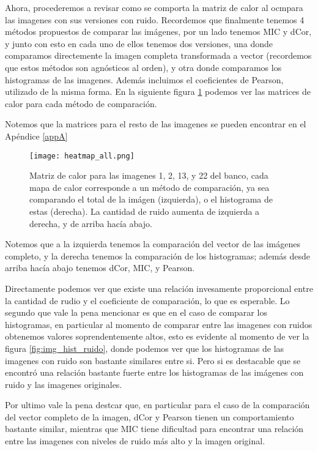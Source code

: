Ahora, procederemos a revisar como se comporta la matriz de calor al ocmpara las imagenes con sus versiones con ruido. Recordemos que finalmente tenemos 4 m\'etodos propuestos de comparar las im\'agenes, por un lado tenemos MIC y dCor, y junto con esto en cada uno de ellos tenemos dos versiones, una donde comparamos directemente la imagen completa transformada a vector (recordemos que estos m\'etodos son agn\'osticos al orden), y otra donde comparamos los histogramas de las imagenes. Adem\'as incluimos el coeficientes de Pearson, utilizado de la misma forma. En la siguiente figura \ref{fig:heatmapall} podemos ver las matrices de calor para cada m\'etodo de comparaci\'on.

Notemos que la matrices para el resto de las imagenes se pueden encontrar en el Ap\'endice \ref{appA}

\begin{figure}[H]
    \centering
    \texttt{[image: heatmap\_all.png]}
    \caption{Matriz de calor para las imagenes 1, 2, 13, y 22 del banco, cada mapa de calor corresponde a un m\'etodo de comparaci\'on, ya sea comparando el total de la im\'agen (izquierda), o el histograma de estas (derecha). La cantidad de ruido aumenta de izquierda a derecha, y de arriba hacía abajo.}
    \label{fig:heatmapall}
\end{figure}

Notemos que a la izquierda tenemos la comparaci\'on del vector de las im\'agenes completo, y la derecha tenemos la comparaci\'on de los histogramas; además desde arriba hac\'ia abajo tenemos dCor, MIC, y Pearson.

Directamente podemos ver que existe una relaci\'on invesamente proporcional entre la cantidad de rudio y el coeficiente de comparaci\'on, lo que es esperable. Lo segundo que vale la pena mencionar es que en el caso de comparar los histogramas, en particular al momento de comparar entre las imagenes con ruidos obtenemos valores soprendentemente altos, esto es evidente al momento de ver la figura \ref{fig:img_hist_ruido}, donde podemos ver que los histogramas de las imagenes con ruido son bastante similares entre si. Pero si es destacable que se encontró una relaci\'on bastante fuerte entre los histogramas de las im\'agenes con ruido y las imagenes originales. 


Por ultimo vale la pena destcar que, en particular para el caso de la comparaci\'on del vector completo de la imagen, dCor y Pearson tienen un comportamiento bastante similar, mientras que MIC tiene dificultad para encontrar una relaci\'on entre las imagenes con niveles de ruido m\'as alto y la imagen original. 
